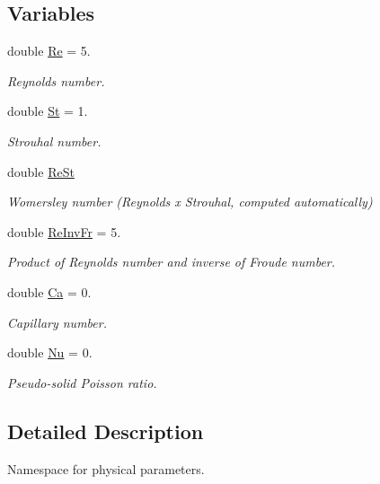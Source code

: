 \subsection*{Variables}
\begin{DoxyCompactItemize}
\item 
double \hyperlink{namespaceGlobal__Physical__Variables_ab814e627d2eb5bc50318879d19ab16b9}{Re} = 5.
\begin{DoxyCompactList}\small\item\em Reynolds number. \end{DoxyCompactList}\item 
double \hyperlink{namespaceGlobal__Physical__Variables_a4b6ef72bd221361c37f5b9a4a6899afc}{St} = 1.
\begin{DoxyCompactList}\small\item\em Strouhal number. \end{DoxyCompactList}\item 
double \hyperlink{namespaceGlobal__Physical__Variables_a085ee4bf968ffdd01a41b8c41864f907}{Re\+St}
\begin{DoxyCompactList}\small\item\em Womersley number (Reynolds x Strouhal, computed automatically) \end{DoxyCompactList}\item 
double \hyperlink{namespaceGlobal__Physical__Variables_aa6286f02b476912dd7550eced538331a}{Re\+Inv\+Fr} = 5.
\begin{DoxyCompactList}\small\item\em Product of Reynolds number and inverse of Froude number. \end{DoxyCompactList}\item 
double \hyperlink{namespaceGlobal__Physical__Variables_a8b32b93d2e546f9375ec418474107838}{Ca} = 0.
\begin{DoxyCompactList}\small\item\em Capillary number. \end{DoxyCompactList}\item 
double \hyperlink{namespaceGlobal__Physical__Variables_a3962c36313826b19f216f6bbbdd6a477}{Nu} = 0.
\begin{DoxyCompactList}\small\item\em Pseudo-\/solid Poisson ratio. \end{DoxyCompactList}\end{DoxyCompactItemize}


\subsection{Detailed Description}
Namespace for physical parameters. 

